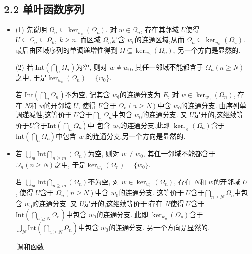  \subsection*{2.2 单叶函数序列}
 \begin{itemize}
    \item[2.2.1]

 (1) 先说明 $\Omega_n\subseteq \ker_{w_0}(\Omega_n)$. 
 对 $w\in \Omega_n$, 存在其邻域 $U$使得 
 $U\subseteq \Omega_n\subseteq \Omega_k,\ k\ge n$. 
 而区域 $\Omega_n$是含 $w_0$的连通区域,从而
 $\Omega_n\subseteq \ker_{w_0}(\Omega_n).$ 
 最后由区域序列的单调递增性得到 $\Omega\subseteq\ker_{w_0}(\Omega_n)$,
 另一个方向是显然的.

 (2) 若 $\text{Int}(\bigcap_n \Omega_n)$为空, 则对 $w\not =w_0$, 
 其任一邻域不能都含于 $\Omega_n(n\ge N)$之中,
 于是$\ker_{w_0}(\Omega_n) = \{w_0\}.$
 
 若 $\text{Int}(\bigcap_n \Omega_n)$不为空, 记其含 $w_0$的连通分支为 $E$, 
 对 $w\in \ker_{w_0}(\Omega_n)$, 存在 $N$和 $w$的开邻域 $U$,
 使得 $U$含于 $\Omega_n(n\ge N)$中含 $w_0$的连通分支.
 由序列单调递减性,这等价于 $U$含于$\bigcap_n \Omega_n$中包含 $w_0$的连通分支. 
 又 $U$是开的,这继续等价于$U$含于$\text{Int}( \bigcap_n \Omega_n)$中
 包含 $w_0$的连通分支.此即 $\ker_{w_0}(\Omega_n)$含于
 $ \text{Int}( \bigcap_n \Omega_n)$中包含 $w_0$的连通分支.另一个方向是显然的.


    \item[2.2.2]

若 $\bigcup_m \text{Int}\bigcap_{n\ge m}(\Omega_n) $为空, 
则对 $w\not =w_0$, 其任一邻域不能都含于 $\Omega_n(n\ge N)$之中,
于是$\ker_{w_0}(\Omega_n) = \{w_0\}.$

若 $\bigcup_m \text{Int}\bigcap_{n\ge m}(\Omega_n) $不为空, 
对 $w\in \ker_{w_0}(\Omega_n)$, 存在 $N$和 $w$的开邻域 $U$,
使得 $U$含于 $\Omega_n(n\ge N)$中含 $w_0$的连通分支. 
这等价于 $U$含于$\bigcap_{n\ge N} \Omega_n$中包含 $w_0$的连通分支. 
又 $U$是开的,这继续等价于:存在 $N$使得 $U$含于
$\text{Int}( \bigcap_{n\ge N} \Omega_n)$中包含 $w_0$的连通分支.
此即 $\ker_{w_0}(\Omega_n)$含于
$\bigcup_{N}\text{Int}( \bigcap_{n\ge N} \Omega_n)$中包含 $w_0$的连通分支.
另一个方向是显然的.
\end{itemize} 

== 调和函数 ==

